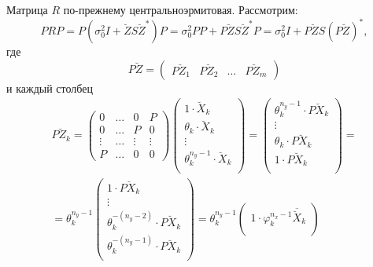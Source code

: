 Матрица $R$ по-прежнему центральноэрмитовая. Рассмотрим:
\[
    P R P
    = P \left ( \sigma_0^2 I + \breve{Z} S \breve{Z}^* \right ) P
    = \sigma_0^2 P P + P \breve{Z} S \breve{Z}^* P
    = \sigma_0^2 I + P \breve{Z} S \left( P \breve{Z} \right)^* ,
\]
где
\[
    P \breve{Z}
    = \begin{pmatrix}
        P \breve{Z}_1 & P \breve{Z}_2 & \dots & P \breve{Z}_m
    \end{pmatrix}
\]
и каждый столбец
\begin{multline*}
    P \breve{Z}_k
    = \begin{pmatrix}
        0      & \dots & 0      & P      \\
        0      & \dots & P      & 0      \\
        \vdots & \dots & \vdots & \vdots \\
        P      & \dots & 0      & 0
    \end{pmatrix}
    \begin{pmatrix}
        1 \cdot \breve{X}_k                \\
        \theta_k \cdot \breve{X}_k         \\
        \vdots                             \\
        \theta_k^{n_y-1} \cdot \breve{X}_k \\
    \end{pmatrix}
    =
    \begin{pmatrix}
        \theta_k^{n_y-1} \cdot P \breve{X}_k \\
        \vdots                               \\
        \theta_k \cdot P \breve{X}_k         \\
        1 \cdot P \breve{X}_k                \\
    \end{pmatrix} =    \\
    = \theta_k^{n_y - 1}
    \begin{pmatrix}
        1 \cdot P \breve{X}_k                     \\
        \vdots                                    \\
        \theta_k^{-(n_y - 2)} \cdot P \breve{X}_k \\
        \theta_k^{-(n_y - 1)} \cdot P \breve{X}_k \\
    \end{pmatrix}
    = \theta_k^{n_y - 1}
    \begin{pmatrix}
        1 \cdot \varphi_k^{n_x - 1} \overline{\breve{X}}_k                     \\

\end{pmatrix}
\end{multline*}
